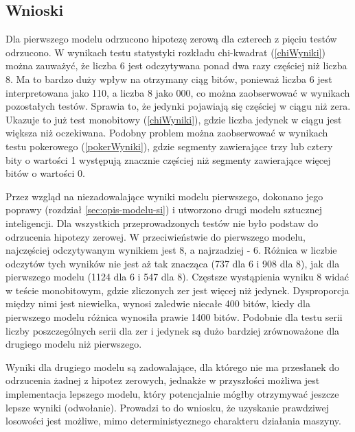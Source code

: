 \subsection{Wnioski}
Dla pierwszego modelu odrzucono hipotezę zerową dla czterech z pięciu testów odrzucono. W wynikach testu statystyki 
rozkładu chi-kwadrat (\ref{chiWyniki}) można zauważyć, że liczba 6 jest odczytywana ponad dwa razy częściej niż 
liczba 8. Ma to bardzo duży wpływ na otrzymany ciąg bitów, ponieważ liczba 6 jest interpretowana jako 110, a 
liczba 8 jako 000, co można zaobserwować w wynikach pozostałych testów. Sprawia to, że jedynki pojawiają się 
częściej w ciągu niż zera. Ukazuje to już test monobitowy (\ref{chiWyniki}), gdzie liczba jedynek w ciągu jest 
większa niż oczekiwana. Podobny problem można zaobserwować w wynikach testu pokerowego (\ref{pokerWyniki}), 
gdzie segmenty zawierające trzy lub cztery bity o wartości 1 występują znacznie częściej niż segmenty zawierające 
więcej bitów o wartości 0. 
\par
Przez wzgląd na niezadowalające wyniki modelu pierwszego, dokonano jego poprawy (rozdział \ref{sec:opis-modelu-si}) i
utworzono drugi modelu sztucznej inteligencji. Dla wszystkich przeprowadzonych testów nie było podstaw do odrzucenia
hipotezy zerowej. W przeciwieństwie do pierwszego modelu, najczęściej odczytywanym wynikiem jest 8, a najrzadziej - 6.
Różnica w liczbie odczytów tych wyników nie jest aż tak znacząca (737 dla 6 i 908 dla 8), jak dla pierwszego modelu 
(1124 dla 6 i 547 dla 8). Częstsze wystąpienia wyniku 8 widać w teście monobitowym, gdzie zliczonych zer jest więcej
niż jedynek. Dysproporcja między nimi jest niewielka, wynosi zaledwie niecałe 400 bitów, kiedy dla pierwszego modelu
różnica wynosiła prawie 1400 bitów. Podobnie dla testu serii liczby poszczególnych serii dla zer i jedynek są dużo
bardziej zrównoważone dla drugiego modelu niż pierwszego.
\par
Wyniki dla drugiego modelu są zadowalające, dla którego nie ma przesłanek do odrzucenia żadnej z hipotez zerowych, 
jednakże w przyszłości możliwa jest implementacja lepszego modelu, który
potencjalnie mógłby otrzymywać jeszcze lepsze wyniki (odwołanie). Prowadzi to do wniosku, że uzyskanie prawdziwej 
losowości jest możliwe, mimo deterministycznego charakteru działania maszyny.
